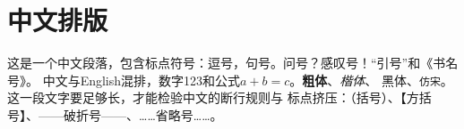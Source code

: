 \documentclass{article}
\begin{document}
\section{中文排版}
这是一个中文段落，包含标点符号：逗号，句号。问号？感叹号！“引号”和《书名号》。
中文与English混排，数字123和公式$a+b=c$。\textbf{粗体}、\textit{楷体}、
\textsf{黑体}、\texttt{仿宋}。这一段文字要足够长，才能检验中文的断行规则与
标点挤压：（括号）、【方括号】、——破折号——、……省略号……。
\end{document}
